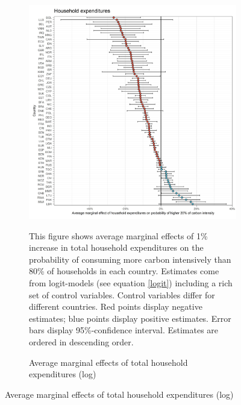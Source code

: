 \begin{figure}[ht!]
  \centering
  \caption{Average marginal effects (logit-models)}\label{fig:Logit_ME}
  \begin{subfigure}[b]{\textwidth}
  \centering
  \caption{Average marginal effects of total household expenditures (log)} \label{fig:Logit_ME_exp}
  \includegraphics{1_Figures/Analysis_Logit_Models_Marginal_Effects/Average_Marginal_Effects_affected_upper_80_log_hh_expenditures_USD_2014_2017.jpg}
  \begin{subcaption2}
     This figure shows average marginal effects of 1\% increase in total household expenditures on the probability of consuming more carbon intensively than 80\% of households in each country. Estimates come from logit-models (see equation \ref{logit}) including a rich set of control variables. Control variables differ for different countries. Red points display negative estimates; blue points display positive estimates. Error bars display 95\%-confidence interval. Estimates are ordered in descending order.
  \end{subcaption2}
  \end{subfigure}
 \end{figure}
 \clearpage

